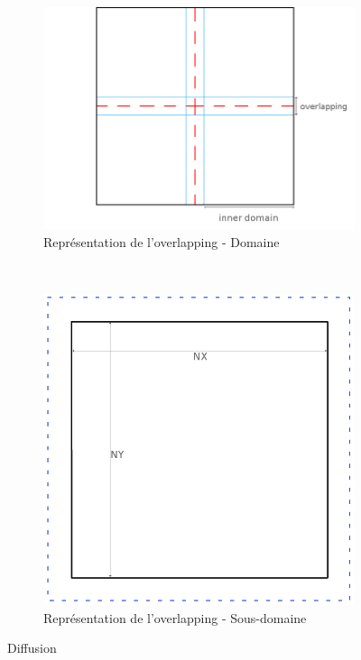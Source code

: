 \begin{figure}[t!]
  \centering
  \begin{subfigure}[b]{0.5\textwidth}
    \centering
    \includegraphics[scale=0.3]{figures/domain_overlap.png}
    \caption{\label{fig:overlap_domain}Représentation de l'overlapping - Domaine}
  \end{subfigure}%
  ~ 
  \begin{subfigure}[b]{0.5\textwidth}
    \centering
    \includegraphics[scale=0.3]{figures/overlap.png}
    \caption{\label{fig:overlap_subdomain}Représentation de l'overlapping - Sous-domaine}
  \end{subfigure}
  \caption{\label{fig:overlap}Diffusion}
\end{figure}

